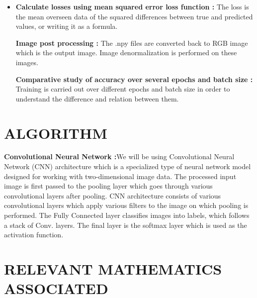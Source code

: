 \documentclass[12pt]{report}	%
\begin{document}
\begin{itemize}
\item
{\bfseries Calculate losses using mean squared error loss function :} The loss is the mean overseen data of the squared differences between true and predicted values, or writing it as a formula.

{\bfseries Image post processing :} The .npy files are converted back to RGB image which is the output image. Image denormalization is performed on these images.

{\bfseries Comparative study of accuracy over several epochs and batch size :} Training is carried out over different epochs and batch size in order to understand the difference and relation between them.

\end{itemize}


\chapter{ALGORITHM}
{\bfseries Convolutional Neural Network :}We will be using Convolutional Neural Network (CNN) architecture which is a specialized type of neural network model designed for working with two-dimensional image data. The processed input image is first passed to the pooling layer which goes through various convolutional layers after pooling. CNN architecture consists of various convolutional layers which apply various filters to the image on which pooling is performed. The Fully Connected layer classifies images into labels, which follows a stack of Conv. layers. The final layer is the softmax layer which is used as the activation function.


\chapter{RELEVANT MATHEMATICS ASSOCIATED}
\end{document}
